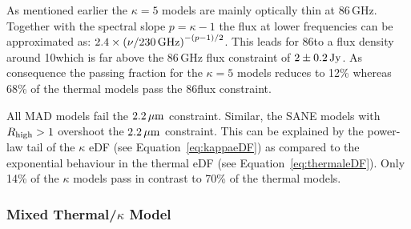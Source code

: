 As mentioned earlier the $\kappa=5$ models are mainly optically thin at 86\,GHz.
Together with the spectral slope $p=\kappa-1$ the flux at lower frequencies can be approximated as: $2.4\times \left(\nu/230\,\mathrm{GHz}\right)^{-(p-1)/2}$.
This leads for 86\GHz to a flux density around 10\Jy which is far above the 86\,GHz flux constraint of $2\pm0.2\,\mathrm{Jy}$.
As consequence the passing fraction for the $\kappa=5$ models reduces to 12\% whereas 68\% of the thermal models pass the 86\GHz flux constraint.


All MAD models fail the $2.2\,\mu\mathrm{m}$ constraint.
Similar, the SANE models with $R_\mathrm{high}>1$ overshoot the $2.2\,\mu\mathrm{m}$ constraint.
This can be explained by the power-law tail of the $\kappa$ eDF (see Equation~\ref{eq:kappaeDF}) as compared to the exponential behaviour in the thermal eDF (see Equation~\ref{eq:thermaleDF}).
Only 14\% of the $\kappa$ models pass in contrast to 70\% of the thermal models.

\subsubsection{Mixed Thermal/\texorpdfstring{$\kappa$}{kappa} Model}

